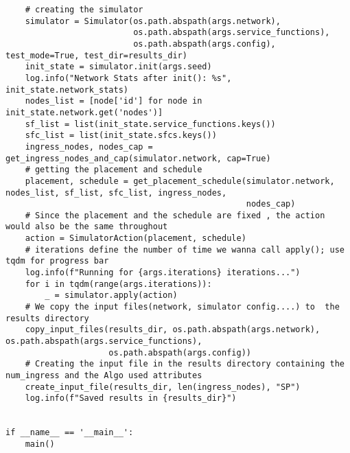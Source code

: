 \begin{lstlisting}
    # creating the simulator
    simulator = Simulator(os.path.abspath(args.network),
                          os.path.abspath(args.service_functions),
                          os.path.abspath(args.config), test_mode=True, test_dir=results_dir)
    init_state = simulator.init(args.seed)
    log.info("Network Stats after init(): %s", init_state.network_stats)
    nodes_list = [node['id'] for node in init_state.network.get('nodes')]
    sf_list = list(init_state.service_functions.keys())
    sfc_list = list(init_state.sfcs.keys())
    ingress_nodes, nodes_cap = get_ingress_nodes_and_cap(simulator.network, cap=True)
    # getting the placement and schedule
    placement, schedule = get_placement_schedule(simulator.network, nodes_list, sf_list, sfc_list, ingress_nodes,
                                                 nodes_cap)
    # Since the placement and the schedule are fixed , the action would also be the same throughout
    action = SimulatorAction(placement, schedule)
    # iterations define the number of time we wanna call apply(); use tqdm for progress bar
    log.info(f"Running for {args.iterations} iterations...")
    for i in tqdm(range(args.iterations)):
        _ = simulator.apply(action)
    # We copy the input files(network, simulator config....) to  the results directory
    copy_input_files(results_dir, os.path.abspath(args.network), os.path.abspath(args.service_functions),
                     os.path.abspath(args.config))
    # Creating the input file in the results directory containing the num_ingress and the Algo used attributes
    create_input_file(results_dir, len(ingress_nodes), "SP")
    log.info(f"Saved results in {results_dir}")


if __name__ == '__main__':
    main()
\end{lstlisting}